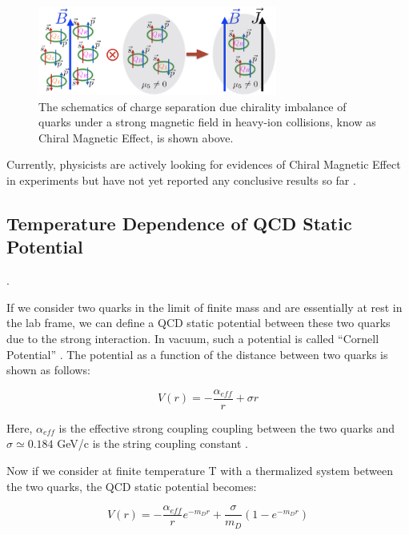 \begin{figure}[hbtp]
\begin{center}
\includegraphics[width=0.70\textwidth]{Figures/Chapter1/ChiralScheme.png}
\caption{The schematics of charge separation due chirality imbalance of quarks under a strong magnetic field in heavy-ion collisions, know as Chiral Magnetic Effect, is shown above.}
\label{ChiralScheme}
\end{center}
\end{figure} 


Currently, physicists are actively looking for evidences of Chiral Magnetic Effect in experiments but have not yet reported any conclusive results so far \cite{CMEExpResult}. 


\subsection{Temperature Dependence of QCD Static Potential}. 

If we consider two quarks in the limit of finite mass and are essentially at rest in the lab frame, we can define a QCD static potential between these two quarks due to the strong interaction. In vacuum, such a potential is called ``Cornell Potential'' \cite{Cornell}. The potential as a function of the distance between two quarks is shown as follows:

\begin{equation}
V(r) = -\frac{\alpha_{eff}}{r} + \sigma r
\end{equation}

Here, $\alpha_{eff}$ is the effective strong coupling coupling between the two quarks and $\sigma \simeq 0.184$ GeV/c is the string coupling constant \cite{CornellEquation}. 

Now if we consider at finite temperature T with a thermalized system  between the two quarks, the QCD static potential becomes: 

\begin{equation}
V(r) = -\frac{\alpha_{eff}}{r} e^{-m_D r} + \frac{\sigma}{m_D} (1 - e^{-m_D r})
\end{equation}


